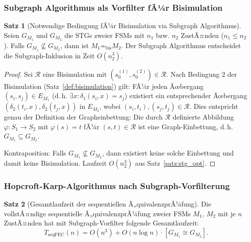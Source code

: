 ﻿\documentclass[a4paper,12pt]{article}
\theoremstyle{definition}
\newtheorem{satz}{Satz}
\begin{document}
\subsubsection{Subgraph Algorithmus als Vorfilter fÃ¼r Bisimulation}

\begin{satz}[Notwendige Bedingung fÃ¼r Bisimulation via Subgraph Algorithmus]
  \label{satz:bisimvorfilter}
  Seien $G_{M_1}$ und $G_{M_2}$ die STGs zweier FSMs mit $n_1$ bzw. $n_2$ ZustÃ¤nden
  ($n_1 \leq n_2$). Falls $G_{M_1} \not\subseteq G_{M_2}$, dann ist
  $M_1 \not\sim_{\text{bis}} M_2$. Der Subgraph Algorithmus entscheidet die
  Subgraph-Inklusion in Zeit $O(n_2^3)$.
\end{satz}

\begin{proof}
  Sei $\mathcal{R}$ eine Bisimulation mit $(s_0^{(1)}, s_0^{(2)}) \in \mathcal{R}$.
  Nach Bedingung 2 der Bisimulation (Satz~\ref{def:bisimulation}) gilt: FÃ¼r jeden
  Ãœbergang $(s_i, s_j) \in E_{M_1}$ (d.\,h. $\exists x: \delta_1(s_i, x) = s_j$)
  existiert ein entsprechender Ãœbergang $(\delta_2(t_i, x), \delta_2(t_j, x))$ in
  $E_{M_2}$, wobei $(s_i, t_i), (s_j, t_j) \in \mathcal{R}$. Dies entspricht genau
  der Definition der Grapheinbettung: Die durch $\mathcal{R}$ definierte Abbildung
  $\varphi: S_1 \to S_2$ mit $\varphi(s) = t$ fÃ¼r $(s,t) \in \mathcal{R}$ ist eine
  Graph-Einbettung, d.\,h. $G_{M_1} \subseteq G_{M_2}$.

  Kontraposition: Falls $G_{M_1} \not\subseteq G_{M_2}$, dann existiert keine solche
  Einbettung und damit keine Bisimulation. Laufzeit $O(n_2^3)$ aus
  Satz~\ref{satz:stg_opt}.
\end{proof}

\subsubsection{Hopcroft-Karp-Algorithmus nach Subgraph-Vorfilterung}

\begin{satz}[Gesamtlaufzeit der sequentiellen Ã„quivalenzprÃ¼fung]\label{satz:seqequiv}
  Die vollstÃ¤ndige sequentielle Ã„quivalenzprÃ¼fung zweier FSMs $M_1$, $M_2$ mit je $n$
  ZustÃ¤nden hat mit Subgraph-Vorfilter folgende Gesamtlaufzeit:
  \[
    T_{\text{seqFEC}}(n) = O(n^3) + O(n \log n) \cdot [G_{M_1} \cong G_{M_2}].
  \]
\end{satz}
\end{document}
